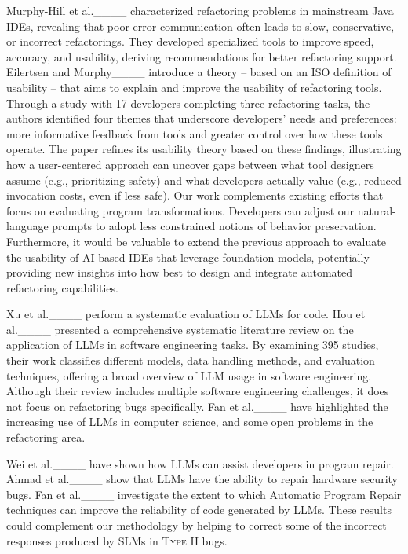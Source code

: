 Murphy-Hill et al.____ characterized refactoring problems in mainstream Java IDEs, revealing that poor error communication often leads to slow, conservative, or incorrect refactorings. They developed specialized tools to improve speed, accuracy, and usability, deriving recommendations for better refactoring support. 
Eilertsen and Murphy____ introduce a theory -- based on an ISO definition of usability -- that aims to explain and improve the usability of refactoring tools. Through a study with 17 developers completing three refactoring tasks, the authors identified four themes that underscore developers' needs and preferences: more informative feedback from tools and greater control over how these tools operate. The paper refines its usability theory based on these findings, illustrating how a user-centered approach can uncover gaps between what tool designers assume (e.g., prioritizing safety) and what developers actually value (e.g., reduced invocation costs, even if less safe).
Our work complements existing efforts that focus on evaluating program transformations. Developers can adjust our natural-language prompts to adopt less constrained notions of behavior preservation. Furthermore, it would be valuable to extend the previous approach to evaluate the usability of AI-based IDEs that leverage foundation models, potentially providing new insights into how best to design and integrate automated refactoring capabilities.


Xu et al.____ perform a systematic evaluation of LLMs for code. Hou et al.____ presented a comprehensive systematic literature review on the application of LLMs in software engineering tasks. By examining 395 studies, their work classifies different models, data handling methods, and evaluation techniques, offering a broad overview of LLM usage in software engineering. Although their review includes multiple software engineering  challenges, it does not focus on refactoring bugs specifically. 
Fan et al.____ have highlighted the increasing use of LLMs in computer science, and some open problems in the refactoring area. 

Wei et al.____ have shown how LLMs can assist developers in program repair.
Ahmad et al.____ show that LLMs have the ability to repair hardware security bugs.
Fan et al.____ investigate the extent to which Automatic Program Repair techniques can improve the reliability of code generated by LLMs. These results could complement our methodology by helping to correct some of the incorrect responses produced by SLMs in \textsc{Type II} bugs.

